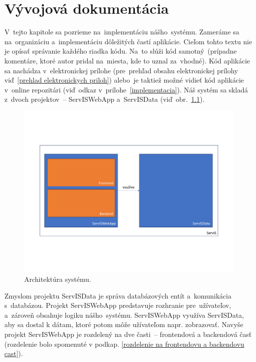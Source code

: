 \chapter{Vývojová dokumentácia}
\label{vyvojova dokumentacia}

V~tejto kapitole sa pozrieme na~implementáciu nášho~systému. Zameráme sa na~organizáciu a~implementáciu dôležitých častí aplikácie. Cieľom tohto textu nie je opísať správanie každého riadka kódu. Na~to slúži kód samotný~(prípadne komentáre, ktoré autor pridal na~miesta, kde to uznal za~vhodné). Kód aplikácie sa nachádza v~elektronickej prílohe (pre~prehľad obsahu elektronickej prílohy viď~\ref{prehlad elektronickych priloh}) alebo~je taktiež možné vidieť kód aplikácie v~online repozitári (viď~odkaz v~prílohe~\ref{implementacia}). Náš systém sa skladá z~dvoch projektov~-- ServISWebApp a~ServISData (viď~obr.~\ref{architektura systemu}).

\begin{figure}[H]\centering
\includegraphics[width=140mm]{../img/architektura systemu}
\caption{Architektúra systému.}
\label{architektura systemu}
\end{figure}

Zmyslom projektu ServISData je správa databázových entít a~komunikácia s~databázou. Projekt ServISWebApp predstavuje rozhranie pre~užívateľov, a~zároveň obsahuje logiku nášho~systému. ServISWebApp využíva ServISData, aby sa dostal k dátam, ktoré potom môže užívateľom napr. zobrazovať. Navyše projekt ServISWebApp je rozdelený na dve časti~-- frontendová a backendová časť (rozdelenie bolo spomenuté v podkap. \ref{rozdelenie na frontendovu a backendovu cast}).

